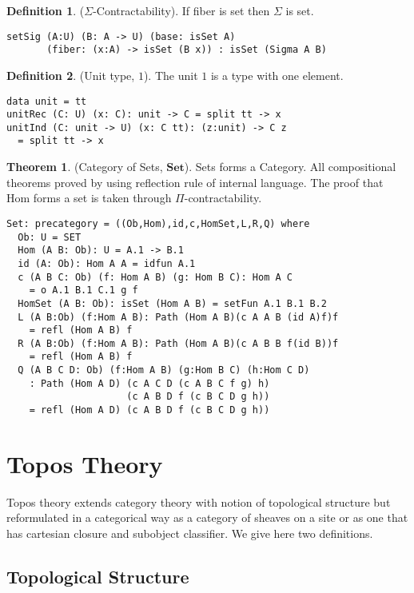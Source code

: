 \documentclass{article}
\theoremstyle{definition}
\newtheorem{definition}{Definition}
\newtheorem{theorem}{Theorem}
\begin{document}
\begin{definition} ($\Sigma$-Contractability).
If fiber is set then $\Sigma$ is set.
\begin{lstlisting}
setSig (A:U) (B: A -> U) (base: isSet A)
       (fiber: (x:A) -> isSet (B x)) : isSet (Sigma A B)
\end{lstlisting}
\end{definition}

\begin{definition} (Unit type, $1$).
The unit $1$ is a type with one element.
\begin{lstlisting}
data unit = tt
unitRec (C: U) (x: C): unit -> C = split tt -> x
unitInd (C: unit -> U) (x: C tt): (z:unit) -> C z
  = split tt -> x
\end{lstlisting}
\end{definition}

\newpage
\begin{theorem} (Category of Sets, $\mathbf{Set}$).
Sets forms a Category.
All compositional theorems proved by using reflection rule of internal language.
The proof that $\mathrm{Hom}$ forms a set is taken through $\Pi$-contractability.
\begin{lstlisting}
Set: precategory = ((Ob,Hom),id,c,HomSet,L,R,Q) where
  Ob: U = SET
  Hom (A B: Ob): U = A.1 -> B.1
  id (A: Ob): Hom A A = idfun A.1
  c (A B C: Ob) (f: Hom A B) (g: Hom B C): Hom A C
    = o A.1 B.1 C.1 g f
  HomSet (A B: Ob): isSet (Hom A B) = setFun A.1 B.1 B.2
  L (A B:Ob) (f:Hom A B): Path (Hom A B)(c A A B (id A)f)f
    = refl (Hom A B) f
  R (A B:Ob) (f:Hom A B): Path (Hom A B)(c A B B f(id B))f
    = refl (Hom A B) f
  Q (A B C D: Ob) (f:Hom A B) (g:Hom B C) (h:Hom C D)
    : Path (Hom A D) (c A C D (c A B C f g) h)
                     (c A B D f (c B C D g h))
    = refl (Hom A D) (c A B D f (c B C D g h))
\end{lstlisting}
\end{theorem}

\section{Topos Theory}

Topos theory extends category theory with notion of topological
structure but reformulated in a categorical way
as a category of sheaves on a site or as one that has cartesian closure
and subobject classifier. We give here two definitions.

\subsection{Topological Structure}
\end{document}
